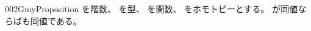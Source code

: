 \documentclass[index]{subfiles}
\begin{document}
\begin{myBlock}{002G}{myProposition}
  を階数、
  を型、
  を関数、
  をホモトピーとする。
  が同値ならばも同値である。
\end{myBlock}
\end{document}
